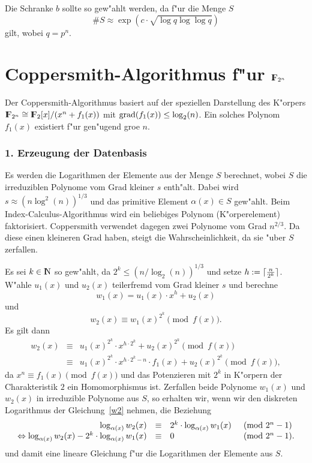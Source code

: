 Die Schranke $b$ sollte so gew"ahlt werden, da\3 f"ur die Menge $S$
$$ \# S \approx \exp\left( c \cdot \sqrt{\log q\log\log q} \right) $$
gilt, wobei $q=p^n$.

\section{Coppersmith-Algorithmus f"ur $\koerper{2^n}$}

Der Coppersmith-Algorithmus basiert auf der speziellen Darstellung des
K"orpers $\koerper{2^n} \cong \koerper{2}[x]/(x^n + f_1(x))$ mit
$\mbox{grad}(f_1(x)) \le \log_2(n)$. Ein solches Polynom $f_1(x)$ existiert
f"ur gen"ugend gro\3e $n$.


\subsubsection*{ 1. Erzeugung der Datenbasis}

Es werden die Logarithmen der Elemente aus der Menge $S$ berechnet,
wobei $S$ die irreduziblen Polynome vom Grad kleiner $s$
enth"alt. Dabei wird $s \approx (n\log^2(n))^{1/3}$ und das primitive
Element $\alpha(x)\in S$ gew"ahlt. Beim Index-Calculus-Algorithmus wird
ein beliebiges Polynom (K"orperelement) faktorisiert. Coppersmith
verwendet dagegen zwei Polynome vom Grad $n^{2/3}$. Da diese einen
kleineren Grad haben, steigt die Wahrscheinlichkeit, da\3 sie "uber
$S$ zerfallen.

Es sei $k\in\N$ so gew"ahlt, da\3 $2^k \le (n/\log_2(n))^{1/3}$ und
setze $h:=\lceil \frac{n}{2^k} \rceil$.  W"ahle $u_1(x)$ und $u_2(x)$
teilerfremd vom Grad kleiner $s$ und berechne
\begin{equation} w_1(x) = u_1(x) \cdot x^h + u_2(x) 
\end{equation}
und
\begin{equation} w_2(x) \equiv w_1(x)^{2^k} \pmod{f(x)}. \label{w2} 
\end{equation}
Es gilt dann 
\begin{eqnarray*} 
  w_2(x) & \equiv & u_1(x)^{2^k} \cdot x^{h \cdot 2^k} 
                                      + u_2(x)^{2^k} \pmod{f(x)} \\
         & \equiv & u_1(x)^{2^k} \cdot x^{h \cdot 2^k - n} \cdot f_1(x) 
                                      + u_2(x)^{2^k} \pmod{f(x)},
\end{eqnarray*}
da $x^n \equiv f_1(x) \pmod{f(x)}$ und das Potenzieren mit $2^k$ in
K"orpern der Charakteristik $2$ ein Homomorphismus ist.  Zerfallen
beide Polynome $w_1(x)$ und $w_2(x)$ in irreduzible Polynome aus $S$,
so erhalten wir, wenn wir den diskreten Logarithmus der
Gleichung~\ref{w2} nehmen, die Beziehung
$$ 
\begin{array}{rcll}
  \log_{\alpha(x)} w_2(x) & \equiv & 2^k \cdot \log_{\alpha(x)} w_1(x) 
                  & \pmod{ 2^n - 1} \\
  \Leftrightarrow \log_{\alpha(x)} w_2(x) - 2^k \cdot \log_{\alpha(x)} w_1(x) 
                  & \equiv & 0 & \pmod{ 2^n - 1}.
\end{array}
$$
und damit eine lineare Gleichung f"ur die Logarithmen der Elemente aus $S$.
      
